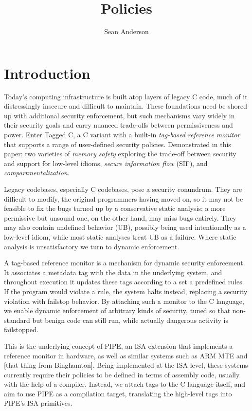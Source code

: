 \documentclass[acmsmall,review,anonymous]{acmart}\settopmatter{printfolios=true,printccs=false,printacmref=false}
\title{Policies}
\author{Sean Anderson}
\affiliation{
  \department{Computer Science}
  \institution{Portland State University}
}
\begin{document}
\maketitle




\section{Introduction}

Today's computing infrastructure is built atop layers of legacy C code, much of it distressingly
insecure and difficult to maintain. These foundations need be shored up with additional security
enforcement, but such mechanisms vary widely in their security goals and carry nuanced trade-offs
between permissiveness and power. Enter Tagged C, a C variant with a built-in
{\em tag-based reference monitor} that supports a range of user-defined security policies.
Demonstrated in this paper: two varieties of {\em memory safety} exploring the trade-off between
security and support for low-level idioms, {\em secure information flow} (SIF),
and {\em compartmentalization}.

Legacy codebases, especially C codebases, pose a security conundrum. They are difficult to
modify, the original programmers having moved on, so it may not be feasible to fix the bugs
turned up by a conservative static analysis; a more permissive but unsound one, on the other hand,
may miss bugs entirely. They may also contain undefined behavior (UB), possibly being used intentionally
as a low-level idiom, while most static analyses treat UB as a failure. Where static analysis
is unsatisfactory we turn to dynamic enforcement.

A tag-based reference monitor is a mechanism for dynamic security enforcement. It associates
a metadata tag with the data in the underlying system, and throughout execution it updates these
tags according to a set a predefined rules. If the program would violate a rule, the system halts
instead, replacing a security violation with failstop behavior. By attaching such a monitor to
the C language, we enable dynamic enforcement of arbitrary kinds of security, tuned so that
non-standard but benign code can still run, while actually dangerous activity is failstopped.

This is the underlying concept of PIPE, an ISA extension that implements a reference monitor in
hardware, as well as similar systems such as ARM MTE and [that thing from Binghamton]. Being
implemented at the ISA level, these systems currently require their policies to be defined in terms of
assembly code, usually with the help of a compiler. Instead, we attach tags to the C language
itself, and aim to use PIPE as a compilation target, translating the high-level tags into
PIPE's ISA primitives.
\end{document}
